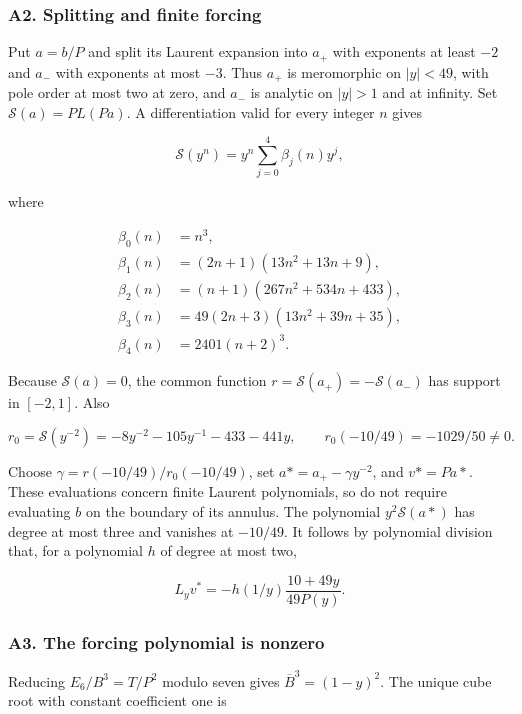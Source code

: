 \documentclass[11pt,a4paper]{article}
\begin{document}
\hypertarget{a2.-splitting-and-finite-forcing}{%
\subsubsection{A2. Splitting and finite forcing}\label{a2.-splitting-and-finite-forcing}}

Put \(a=b/P\) and split its Laurent expansion into \(a_{+}\) with exponents at least \(-2\) and \(a_{-}\) with exponents at most \(-3\). Thus \(a_{+}\) is meromorphic on \(|y|<49\), with pole order at most two at zero, and \(a_{-}\) is analytic on \(|y|>1\) and at infinity. Set \(\mathcal{S}(a)=P L(Pa)\). A differentiation valid for every integer \(n\) gives

\[
\mathcal S(y^n)=y^n\sum_{j=0}^4\beta_j(n)y^j,\tag{9}
\]

where

\[
\begin{aligned}
\beta_0(n)&=n^3,\\
\beta_1(n)&=(2n+1)(13n^2+13n+9),\\
\beta_2(n)&=(n+1)(267n^2+534n+433),\\
\beta_3(n)&=49(2n+3)(13n^2+39n+35),\\
\beta_4(n)&=2401(n+2)^3.
\end{aligned}
\]

Because \(\mathcal{S}(a)=0\), the common function \(r=\mathcal{S}(a_{+})=-\mathcal{S}(a_{-})\) has support in \([-2,1]\). Also

\[
r_0=\mathcal S(y^{-2})=-8y^{-2}-105y^{-1}-433-441y,
\qquad r_0(-10/49)=-1029/50\ne0.
\]

Choose \(γ=r(-10/49)/r_{0}(-10/49)\), set \(a*=a_{+}-γy^{-2}\), and \(v*=Pa*\). These evaluations concern finite Laurent polynomials, so do not require evaluating \(b\) on the boundary of its annulus. The polynomial \(y^{2}\mathcal{S}(a*)\) has degree at most three and vanishes at \(-10/49\). It follows by polynomial division that, for a polynomial \(h\) of degree at most two,

\[
L_yv^*=-h(1/y)\frac{10+49y}{49P(y)}.\tag{10}
\]

\hypertarget{a3.-the-forcing-polynomial-is-nonzero}{%
\subsubsection{A3. The forcing polynomial is nonzero}\label{a3.-the-forcing-polynomial-is-nonzero}}

Reducing \(E_{6}/B^{3}=T/P^{2}\) modulo seven gives \(\overline{B}^{3}=(1-y)^{2}\). The unique cube root with constant coefficient one is
\end{document}

